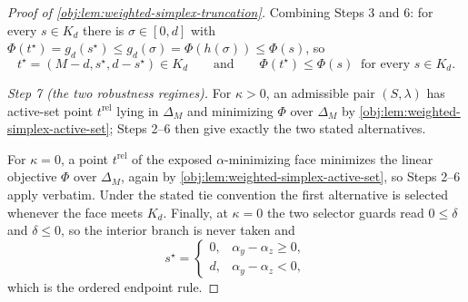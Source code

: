 \begin{proof}[Proof of \cref{obj:lem:weighted-simplex-truncation}]
Combining Steps 3 and 6: for every \(s\in K_d\) there is \(\sigma\in[0,d]\) with \(\Phi(t^\star)=g_d(s^\star)\le g_d(\sigma)=\Phi(h(\sigma))\le\Phi(s)\), so
\[
t^\star=(M-d,s^\star,d-s^\star)\in K_d
\qquad\text{and}\qquad
\Phi(t^\star)\le\Phi(s)\ \text{ for every }s\in K_d .
\]

\emph{Step 7 (the two robustness regimes).}  For \(\kappa>0\), an admissible pair \((S,\lambda)\) has active-set point \(t^{\mathrm{rel}}\) lying in \(\Delta_M\) and minimizing \(\Phi\) over \(\Delta_M\) by \cref{obj:lem:weighted-simplex-active-set}; Steps 2--6 then give exactly the two stated alternatives. %

For \(\kappa=0\), a point \(t^{\mathrm{rel}}\) of the exposed \(\alpha\)-minimizing face minimizes the linear objective \(\Phi\) over \(\Delta_M\), again by \cref{obj:lem:weighted-simplex-active-set}, so Steps 2--6 apply verbatim.  Under the stated tie convention the first alternative is selected whenever the face meets \(K_d\).  Finally, at \(\kappa=0\) the two selector guards read \(0\le\delta\) and \(\delta\le0\), so the interior branch is never taken and
\[
s^\star=\begin{cases}0,&\alpha_y-\alpha_z\ge0,\\ d,&\alpha_y-\alpha_z<0,\end{cases}
\]
which is the ordered endpoint rule. %
\end{proof}
